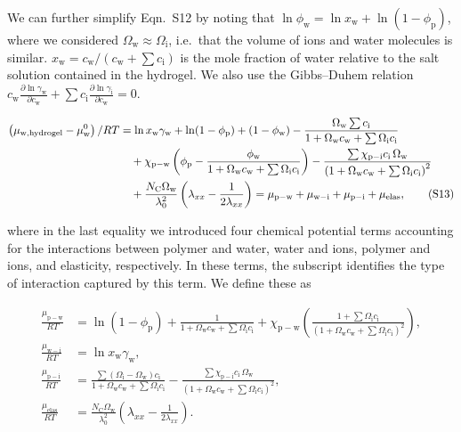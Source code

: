 \documentclass[11pt]{article}
\begin{document}
We can further simplify Eqn.~S12 by noting that $\ln \phi_\mathrm{w} = \ln x_\mathrm{w} + \ln(1 - \phi_\mathrm{p})$, where we considered $\Omega_\mathrm{w} \approx \Omega_\mathrm{i}$, i.e.\ that the volume of ions and water molecules is similar. $x_\mathrm{w} = c_\mathrm{w}/(c_\mathrm{w} + \sum c_\mathrm{i})$ is the mole fraction of water relative to the salt solution contained in the hydrogel. We also use the Gibbs--Duhem relation $c_\mathrm{w}\frac{\partial \ln \gamma_\mathrm{w}}{\partial c_\mathrm{w}} + \sum c_\mathrm{i} \frac{\partial \ln \gamma_\mathrm{i}}{\partial c_\mathrm{w}} = 0$.\cite{stolen2003}

\begin{align}
\left(\mu_\mathrm{w,hydrogel} - \mu_\mathrm{w}^0\right)/RT
&= \ln x_\mathrm{w}\gamma_\mathrm{w} + \ln(1 - \phi_\mathrm{p}) + \left(1 - \phi_\mathrm{w}\right) - \frac{\Omega_\mathrm{w} \sum c_\mathrm{i}}{1 + \Omega_\mathrm{w} c_\mathrm{w} + \sum \Omega_\mathrm{i} c_\mathrm{i}} \notag\\
&\quad + \chi_\mathrm{p-w}\left(\phi_\mathrm{p} - \frac{\phi_\mathrm{w}}{1 + \Omega_\mathrm{w} c_\mathrm{w} + \sum \Omega_\mathrm{i} c_\mathrm{i}}\right) - \frac{\sum \chi_\mathrm{p-i} c_\mathrm{i}\, \Omega_\mathrm{w}}{\left(1 + \Omega_\mathrm{w} c_\mathrm{w} + \sum \Omega_\mathrm{i} c_\mathrm{i}\right)^2} \notag\\
&\quad + \frac{N_\mathrm{C} \Omega_\mathrm{w}}{\lambda_0^2}\left(\lambda_{xx} - \frac{1}{2\lambda_{xx}}\right)
= \mu_\mathrm{p-w} + \mu_\mathrm{w-i} + \mu_\mathrm{p-i} + \mu_\mathrm{elas}, \tag{S13}
\end{align}

where in the last equality we introduced four chemical potential terms accounting for the interactions between polymer and water, water and ions, polymer and ions, and elasticity, respectively. In these terms, the subscript identifies the type of interaction captured by this term. We define these as

\begin{align}
\frac{\mu_\mathrm{p-w}}{RT} &= \ln(1-\phi_\mathrm{p}) + \frac{1}{1 + \Omega_\mathrm{w} c_\mathrm{w} + \sum \Omega_\mathrm{i} c_\mathrm{i}} + \chi_\mathrm{p-w}\left(\frac{1 + \sum \Omega_\mathrm{i} c_\mathrm{i}}{\left(1 + \Omega_\mathrm{w} c_\mathrm{w} + \sum \Omega_\mathrm{i} c_\mathrm{i}\right)^2}\right), \tag{S14}\\[6pt]
\frac{\mu_\mathrm{w-i}}{RT} &= \ln x_\mathrm{w}\gamma_\mathrm{w}, \tag{S15}\\[6pt]
\frac{\mu_\mathrm{p-i}}{RT} &= \frac{\sum (\Omega_\mathrm{i} - \Omega_\mathrm{w}) c_\mathrm{i}}{1 + \Omega_\mathrm{w} c_\mathrm{w} + \sum \Omega_\mathrm{i} c_\mathrm{i}} - \frac{\sum \chi_\mathrm{p-i} c_\mathrm{i}\, \Omega_\mathrm{w}}{\left(1 + \Omega_\mathrm{w} c_\mathrm{w} + \sum \Omega_\mathrm{i} c_\mathrm{i}\right)^2}, \tag{S16}\\[6pt]
\frac{\mu_\mathrm{elas}}{RT} &= \frac{N_\mathrm{C} \Omega_\mathrm{w}}{\lambda_0^2}\left(\lambda_{xx} - \frac{1}{2\lambda_{xx}}\right). \tag{S17}
\end{align}
\end{document}
